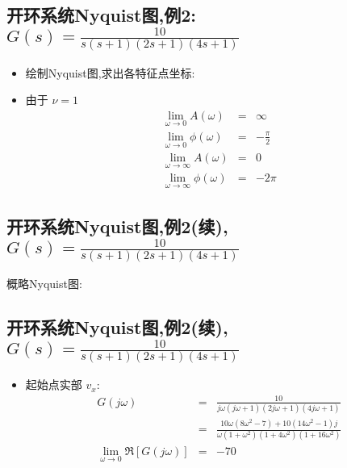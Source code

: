 \documentclass[table]{beamer}
\begin{document}
\subsection{开环系统Nyquist图,例2:\(G(s)=\frac{10}{s(s+1)(2s+1)(4s+1)}\)}
\label{sec:org0aa4087}
\begin{itemize}
\item 绘制Nyquist图,求出各特征点坐标:
\item 由于  \(\nu = 1\) 
\begin{eqnarray*}
\lim_{\omega\rightarrow 0} A(\omega) & = & \infty\\
\lim_{\omega\rightarrow 0} \phi(\omega)&=&-\frac{\pi}{2} \\
\lim_{\omega\rightarrow\infty} A(\omega)&=&0 \\
\lim_{\omega\rightarrow\infty} \phi(\omega)&=& -2\pi 
\end{eqnarray*}
\end{itemize}
\subsection{开环系统Nyquist图,例2(续),\(G(s)=\frac{10}{s(s+1)(2s+1)(4s+1)}\)}
\label{sec:org323bddd}
概略Nyquist图:

\begin{center}
\end{center}
\subsection{开环系统Nyquist图,例2(续),\(G(s)=\frac{10}{s(s+1)(2s+1)(4s+1)}\)}
\label{sec:orgbd5b4cc}
\begin{itemize}
\item 起始点实部  \(v_x\):
\begin{eqnarray*}
G(j\omega) & = & \frac{10}{j\omega(j\omega+1)(2j\omega+1)(4j\omega+1)}\\
   &=& \frac{10\omega(8\omega^2-7)+10(14\omega^2-1)j}{\omega(1+\omega^2)(1+4\omega^2)(1+16\omega^2)}\\
\lim_{\omega\rightarrow 0}\Re[G(j\omega)] &=&-70
\end{eqnarray*}
\end{itemize}
\end{document}
